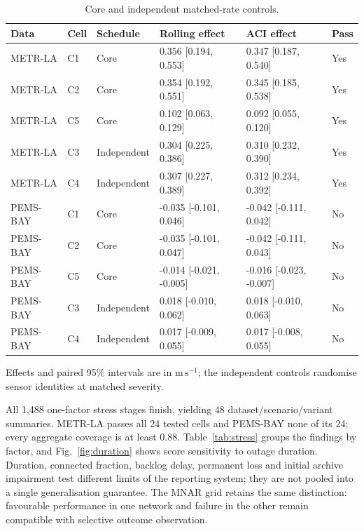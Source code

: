 \documentclass[pdflatex,sn-mathphys-num]{sn-jnl}
\newcommand{\ms}{\mathrm{m\,s^{-1}}}
\begin{document}
\begin{table}[!htbp]
\caption{Core and independent matched-rate controls.}\label{tab:controls}
\centering\setlength{\tabcolsep}{3pt}\small
\begin{tabular}{llllll}\toprule
Data & Cell & Schedule & Rolling effect & ACI effect & Pass \\\midrule
METR-LA & C1 & Core & 0.356 [0.194, 0.553] & 0.347 [0.187, 0.540] & Yes \\
METR-LA & C2 & Core & 0.354 [0.192, 0.551] & 0.345 [0.185, 0.538] & Yes \\
METR-LA & C5 & Core & 0.102 [0.063, 0.129] & 0.092 [0.055, 0.120] & Yes \\
METR-LA & C3 & Independent & 0.304 [0.225, 0.386] & 0.310 [0.232, 0.390] & Yes \\
METR-LA & C4 & Independent & 0.307 [0.227, 0.389] & 0.312 [0.234, 0.392] & Yes \\
PEMS-BAY & C1 & Core & -0.035 [-0.101, 0.046] & -0.042 [-0.111, 0.042] & No \\
PEMS-BAY & C2 & Core & -0.035 [-0.101, 0.047] & -0.042 [-0.111, 0.043] & No \\
PEMS-BAY & C5 & Core & -0.014 [-0.021, -0.005] & -0.016 [-0.023, -0.007] & No \\
PEMS-BAY & C3 & Independent & 0.018 [-0.010, 0.062] & 0.018 [-0.010, 0.063] & No \\
PEMS-BAY & C4 & Independent & 0.017 [-0.009, 0.055] & 0.017 [-0.008, 0.055] & No \\
\bottomrule\end{tabular}
\par\smallskip\footnotesize Effects and paired 95\% intervals are in $\ms$; the independent controls randomise sensor identities at matched severity.
\end{table}
\FloatBarrier

All 1,488 one-factor stress stages finish, yielding 48 dataset/scenario/variant summaries. METR-LA passes all 24 tested cells and PEMS-BAY none of its 24; every aggregate coverage is at least 0.88. Table~\ref{tab:stress} groups the findings by factor, and Fig.~\ref{fig:duration} shows score sensitivity to outage duration. Duration, connected fraction, backlog delay, permanent loss and initial archive impairment test different limits of the reporting system; they are not pooled into a single generalisation guarantee. The MNAR grid retains the same distinction: favourable performance in one network and failure in the other remain compatible with selective outcome observation.
\end{document}
